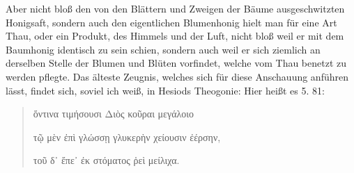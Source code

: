 \documentclass[a4paper, 11pt, oneside]{article}
\begin{document}
Aber nicht bloß den von den Blättern und Zweigen der Bäume ausgeschwitzten Honigsaft, sondern auch den eigentlichen Blumenhonig hielt man für eine Art Thau, oder ein Produkt, des Himmels und der Luft, nicht bloß weil er mit dem Baumhonig identisch zu sein schien, sondern auch weil er sich ziemlich an derselben Stelle der Blumen und Blüten vorfindet, welche vom Thau benetzt zu werden pflegte. Das älteste Zeugnis, welches sich für diese Anschauung anführen lässt, findet sich, soviel ich weiß, in Hesiods Theogonie: Hier heißt es 5. 81:
\begin{quotation}\large
ὅντινα τιμήσουσι Διὸς κοῦραι μεγάλοιο

τῷ μὲν ἐπὶ γλώσσῃ γλυκερὴν χείουσιν ἐέρσην,

τοῦ δ᾽ ἔπε᾽ ἐκ στόματος ῥεὶ μείλιχα.
\end{quotation}
\paragraph{}
\end{document}
